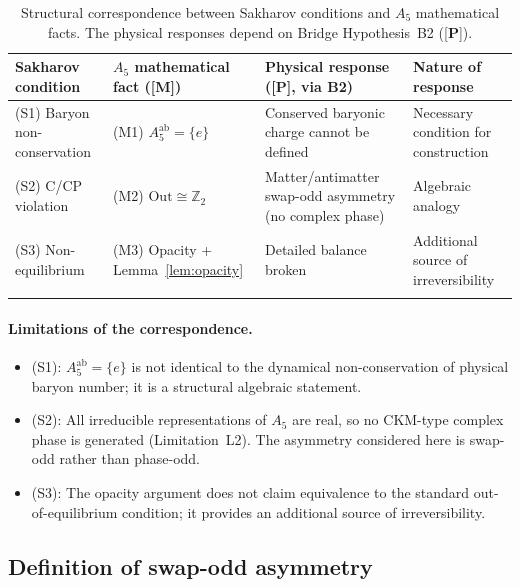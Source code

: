 \documentclass[sn-mathphys-num,Numbered]{sn-jnl}
\theoremstyle{thmstyleone}
\theoremstyle{thmstylethree}
\theoremstyle{thmstyletwo}
\newcommand{\tagM}{[\textbf{M}]}
\newcommand{\tagP}{[\textbf{P}]}
\begin{document}
\begin{table}[h]
\caption{Structural correspondence between Sakharov conditions and
$A_5$ mathematical facts.  The physical responses depend on
Bridge Hypothesis~B2 (\tagP).}
\label{tab:sakharov}
\begin{tabular}{@{}p{2.8cm}p{2.8cm}p{3.6cm}p{2.4cm}@{}}
\toprule
Sakharov condition &
$A_5$ mathematical fact (\tagM) &
Physical response (\tagP, via B2) &
Nature of response \\
\midrule
(S1) Baryon non-conservation &
(M1) $A_5^{\mathrm{ab}}=\{e\}$ &
Conserved baryonic charge cannot be defined &
Necessary condition for construction \\[4pt]
(S2) C/CP violation &
(M2) $\mathrm{Out}\cong\mathbb{Z}_2$ &
Matter/antimatter swap-odd asymmetry (no complex phase) &
Algebraic analogy \\[4pt]
(S3) Non-equilibrium &
(M3) Opacity + Lemma~\ref{lem:opacity} &
Detailed balance broken &
Additional source of irreversibility \\
\botrule
\end{tabular}
\end{table}

\paragraph{Limitations of the correspondence.}
\begin{itemize}
  \item (S1): $A_5^{\mathrm{ab}} = \{e\}$ is not identical to the
    dynamical non-conservation of physical baryon number; it is a
    structural algebraic statement.
  \item (S2): All irreducible representations of $A_5$ are real, so no
    CKM-type complex phase is generated (Limitation~L2).  The
    asymmetry considered here is swap-odd rather than phase-odd.
  \item (S3): The opacity argument does not claim equivalence to the
    standard out-of-equilibrium condition; it provides an additional
    source of irreversibility.
\end{itemize}

\subsection{Definition of swap-odd asymmetry}
\label{ssec:swap-odd}
\end{document}
